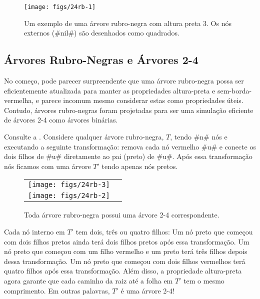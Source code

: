 \begin{figure}
	\begin{center}
		\texttt{[image: figs/24rb-1]}
	\end{center}
	\caption[A red-black tree]{Um exemplo de uma árvore rubro-negra com altura preta 3. Os nós externos (#nil#) são desenhados como quadrados.}
\end{figure}


\subsection{Árvores Rubro-Negras e Árvores 2-4}

No começo, pode parecer surpreendente que uma árvore rubro-negra possa ser eficientemente
atualizada para manter as propriedades altura-preta e sem-borda-vermelha, e
parece incomum mesmo considerar estas como propriedades úteis. Contudo,
árvores rubro-negras foram projetadas para ser uma simulação eficiente de árvores 2-4
como árvores binárias.

Consulte a .
Considere qualquer árvore rubro-negra, $T$, tendo #n# nós e executando a
seguinte transformação: remova cada nó vermelho #u# e conecte os dois
filhos de #u# diretamente ao pai (preto) de #u#. Após essa transformação
nós ficamos com uma árvore $T'$ tendo apenas nós pretos.
\begin{figure}
	\begin{center}
		\begin{tabular}{cc}
			\texttt{[image: figs/24rb-3]} \\
			\texttt{[image: figs/24rb-2]}
		\end{tabular}
	\end{center}
	\caption{Toda árvore rubro-negra possui uma árvore 2-4 correspondente.}
\end{figure}

Cada nó interno em $T'$ tem dois, três ou quatro filhos: Um nó preto
que começou com dois filhos pretos ainda terá dois
filhos pretos após essa transformação. Um nó preto que começou
com um filho vermelho e um preto terá três filhos depois dessa
transformação. Um nó preto que começou com dois filhos vermelhos
terá quatro filhos após essa transformação. Além disso, a
propriedade altura-preta agora garante que cada caminho da raiz até a folha em $T'$ tem o mesmo comprimento. Em outras palavras, $T'$ é uma árvore 2-4!


